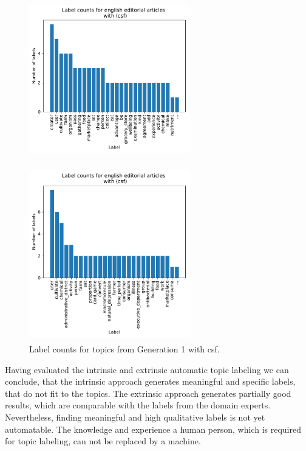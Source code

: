 {\begin{figure}
	\begin{minipage}{0.5\textwidth}
		\includegraphics[width=7cm,height=7.5cm]{gfx/ATL_sim/with_scoring_pre.pdf}
	\end{minipage}
	\begin{minipage}{0.5\textwidth}
		\includegraphics[width=7cm,height=7.5cm]{gfx/ATL_sim/with_scoring.pdf}
	\end{minipage}
	\caption{Label counts for topics from Generation 1 with \ac{csf}.}
	\label{extr_csf_count}
\end{figure}

Having evaluated the intrinsic and extrinsic automatic topic labeling we can conclude, that the intrinsic approach generates meaningful and specific labels, that do not fit to the topics. The extrinsic approach  generates partially good results, which are comparable with the labels from the domain experts. Nevertheless, finding meaningful and high qualitative labels is not yet automatable. The knowledge and experience a human person, which is required for topic labeling, can not be replaced by a machine.

\cleardoublepage

}
